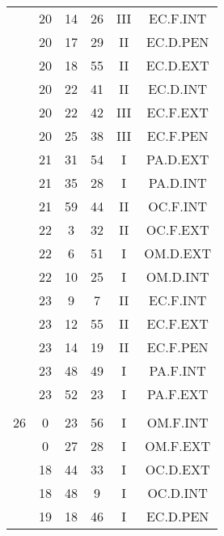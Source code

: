 \documentclass[12pt, a4paper]{article}
\begin{document}
\begin{multicols}{3}
{\begin{tabular}{c c c c c c}
	 	 	 	 & 20 & 14 & 26 & III & EC.F.INT\\%
	 	 	 	 & 20 & 17 & 29 & II & EC.D.PEN\\%
	 	 	 	 & 20 & 18 & 55 & II & EC.D.EXT\\%
	 	 	 	 & 20 & 22 & 41 & II & EC.D.INT\\%
	 	 	 	 & 20 & 22 & 42 & III & EC.F.EXT\\%
	 	 	 	 & 20 & 25 & 38 & III & EC.F.PEN\\%
	 	 	 	 & 21 & 31 & 54 & I & PA.D.EXT\\%
	 	 	 	 & 21 & 35 & 28 & I & PA.D.INT\\%
	 	 	 	 & 21 & 59 & 44 & II & OC.F.INT\\%
	 	 	 	 & 22 & 3 & 32 & II & OC.F.EXT\\%
	 	 	 	 & 22 & 6 & 51 & I & OM.D.EXT\\%
	 	 	 	 & 22 & 10 & 25 & I & OM.D.INT\\%
	 	 	 	 & 23 & 9 & 7 & II & EC.F.INT\\%
	 	 	 	 & 23 & 12 & 55 & II & EC.F.EXT\\%
	 	 	 	 & 23 & 14 & 19 & II & EC.F.PEN\\%
	 	 	 	 & 23 & 48 & 49 & I & PA.F.INT\\%
	 	 	 	 & 23 & 52 & 23 & I & PA.F.EXT\\%
	 	 	 	 & & & & & \\%
	 	 	 	26 & 0 & 23 & 56 & I & OM.F.INT\\%
	 	 	 	 & 0 & 27 & 28 & I & OM.F.EXT\\%
	 	 	 	 & 18 & 44 & 33 & I & OC.D.EXT\\%
	 	 	 	 & 18 & 48 & 9 & I & OC.D.INT\\%
	 	 	 	 & 19 & 18 & 46 & I & EC.D.PEN\\%

\end{tabular}}
\end{multicols}
\end{document}
